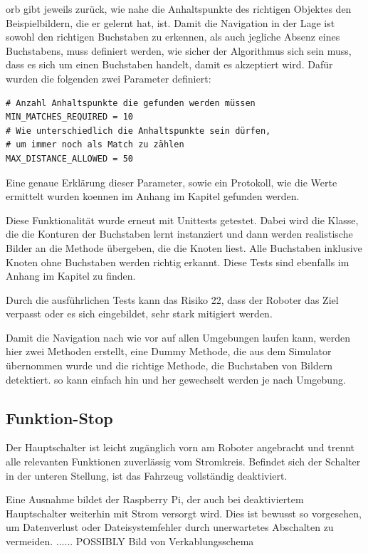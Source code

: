 \acrshort{orb} gibt jeweils zurück, wie nahe die Anhaltspunkte des richtigen Objektes den Beispielbildern, die er gelernt hat, ist. Damit die Navigation in der Lage ist sowohl den richtigen Buchstaben zu erkennen, als auch jegliche Absenz eines Buchstabens, muss definiert werden, wie sicher der Algorithmus sich sein muss, dass es sich um einen Buchstaben handelt, damit es akzeptiert wird. Dafür wurden die folgenden zwei Parameter definiert:
\begin{verbatim}
# Anzahl Anhaltspunkte die gefunden werden müssen
MIN_MATCHES_REQUIRED = 10
# Wie unterschiedlich die Anhaltspunkte sein dürfen,
# um immer noch als Match zu zählen
MAX_DISTANCE_ALLOWED = 50
\end{verbatim}

Eine genaue Erklärung dieser Parameter, sowie ein Protokoll, wie die Werte ermittelt wurden koennen im Anhang im Kapitel  gefunden werden.

Diese Funktionalität wurde erneut mit Unittests getestet.
Dabei wird die Klasse, die die Konturen der Buchstaben lernt instanziert und dann werden realistische Bilder an die Methode übergeben, die die Knoten liest. Alle Buchstaben inklusive Knoten ohne Buchstaben werden richtig erkannt. Diese Tests sind ebenfalls im Anhang im Kapitel  zu finden.

Durch die ausführlichen Tests kann das Risiko 22, dass der Roboter das Ziel verpasst oder es sich eingebildet, sehr stark mitigiert werden.

Damit die Navigation nach wie vor auf allen Umgebungen laufen kann, werden hier zwei Methoden erstellt, eine Dummy Methode, die aus dem Simulator übernommen wurde und die richtige Methode, die Buchstaben von Bildern detektiert. so kann einfach hin und her gewechselt werden je nach Umgebung.


\newpage
\subsection{Funktion-Stop}


Der Hauptschalter ist leicht zugänglich vorn am Roboter angebracht und trennt alle  relevanten Funktionen zuverlässig vom Stromkreis. Befindet sich der Schalter in der unteren Stellung, ist das Fahrzeug vollständig deaktiviert.

Eine Ausnahme bildet der Raspberry Pi, der auch bei deaktiviertem Hauptschalter weiterhin mit Strom versorgt wird. Dies ist bewusst so vorgesehen, um Datenverlust oder Dateisystemfehler durch unerwartetes Abschalten zu vermeiden.
...... POSSIBLY Bild von Verkablungsschema


